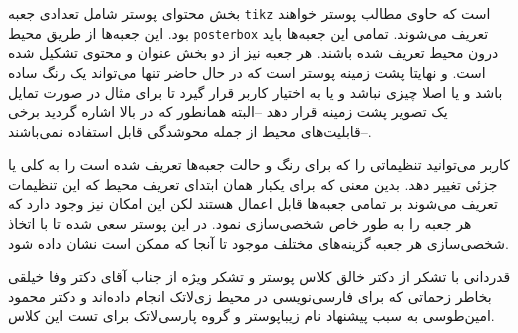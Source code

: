 \documentclass[debug,a0paper,persian]{xebaposter}
\begin{document}
\begin{poster}
\begin{posterbox}[name=imagedataset,column=0,span=1,below=introduction,textborder=roundedleft]
بخش محتوای پوستر شامل تعدادی جعبه \texttt{tikz} است که حاوی مطالب پوستر خواهند بود. این جعبه‌ها از طریق 
محیط \texttt{posterbox} تعریف می‌شوند. تمامی این جعبه‌ها باید درون محیط  تعریف شده باشند. 
هر جعبه نیز از دو بخش عنوان و محتوی تشکیل شده است. و نهایتا پشت زمینه پوستر است که در حال حاضر تنها می‌تواند یک رنگ ساده 
باشد و یا اصلا چیزی نباشد و یا به اختیار کاربر قرار گیرد تا برای مثال در صورت تمایل یک تصویر پشت زمینه قرار دهد --البته همانطور که 
در بالا اشاره گردید برخی قابلیت‌های محیط  از جمله محوشدگی قابل استفاده نمی‌باشند--. 
\end{posterbox}
\begin{posterbox}[name=setting,column=0,span=1,below=imagedataset%
,headerFontColor=brown,textborder=roundedright,headershape=roundedright]
{}
کاربر می‌توانید تنظیماتی را که برای رنگ و حالت جعبه‌ها تعریف شده است را به کلی یا جزئی تغییر دهد. بدین معنی که برای یکبار همان
ابتدای تعریف محیط  که این تنظیمات تعریف می‌شوند بر تمامی جعبه‌ها قابل اعمال هستند لکن این امکان نیز وجود دارد 
که هر جعبه را به طور خاص شخصی‌سازی نمود. در این پوستر سعی شده تا با اتخاذ 
شخصی‌سازی هر جعبه گزینه‌های مختلف موجود تا آنجا که ممکن است نشان داده شود. 
\end{posterbox}
\begin{posterbox}[name=ack,column=0,span=1,below=setting,
,textborder=triangles]{قدردانی}
با تشکر از دکتر  خالق کلاس پوستر و تشکر ویژه از جناب آقای دکتر وفا خیلقی بخاطر زحماتی که برای فارسی‌نویسی در
محیط زی‌لاتک انجام‌ داده‌اند و دکتر محمود امین‌طوسی به سبب پیشنهاد نام زیباپوستر و گروه پارسی‌لاتک برای تست این کلاس.

\end{posterbox} 
\end{poster}
\end{document}
